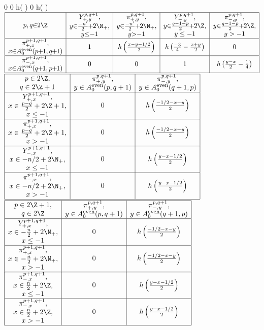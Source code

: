 \renewcommand{\d}[1]{\kern-0.1cm #1\kern-0.1cm}
\hspace*{0cm}\mytableFourTwo	%
{}											{}
{}			{0}
{}										{0}
{}									{h\left(  \right)}
\hspace*{0cm}\mytableThreeTwo	%
{}						{}
{}					{0}
{}					{h\left(  \right)}
\hspace*{-1.4cm}$\begin{array}{|@{}c@{}|@{}c@{}|@{}c@{}|@{}c@{}|@{}c@{}|}\hline	%
	\mrv{p,q\d{\in}2\Z} {\mystackiii{\yipy}{y\d{\in}\frac{-n'}{2}\d{+}2\N_+}{y\d{\le}-1}}{\mystackiii{\pipy}{y\d{\in}\frac{-n'}{2}\d{+}2\N_+}{y\d{>}-1}}
	{\mystackiii{\yimy}{y\d{\in} \frac{q-1-p}{2}\d{+}\tz}{y\le-1}}	{\mystackiii{\pimy}{y\kern-0.1cm\in\kern-0.1cm \frac{q-1-p}{2}\d{+}\tz}{y>-1}}
\mrv{\mystack{\pipx}{x\d{\in} \Azeven(p\d{+}1,q\d{+}1)}}	{1}	{h\left(\frac{x-y-1/2}{2}\right)} 	{h\left( \frac{-3}{4}-\frac{x+y}{2}\right)}{0}
\mrv{\mystack{\pimx}{x\d{\in} \Azeven(q\d{+}1,p\d{+}1)}}	{0} 				 	{0}{1} {h\left( \frac{y-x}{2}-\frac{1}{4} \right)}
\end{array}\newline$
\hspace*{-0cm}$\begin{array}{|@{}c@{}|@{}c@{}|@{}c@{}|}\hline	%
\mriii{\mystack{p\in2\Z}{q\in2\Z+1}}		{\mystack{\pipy}{y\in A_0^{\mbox{\normalfont\footnotesize even}}(p,q+1)}}	{\mystack{\pimy}{y\in A_0^{\mbox{\normalfont \footnotesize even}}(q+1,p)}}
\mriii{\mystackiii{\yipx}{x\in \frac{p-q}{2}+\tzo}{x\le-1}} {0} 										{h\left( \frac{-1/2-x-y}{2} \right)}
\mriii{\mystackiii{\pipx}{x\in \frac{p-q}{2}+\tzo}{x>-1}} {0} 										{h\left( \frac{-1/2-x-y}{2} \right)}
\mriii{\mystackiii{\yimx}{x\in -n/2+2\N_+}{x\le-1}} {0} {h\left( \frac{y-x-1/2}{2} \right)}
\mriii{\mystackiii{\pimx}{x\in -n/2+2\N_+}{x>-1}} {0} {h\left( \frac{y-x-1/2}{2} \right)}
\end{array}\newline$
\hspace*{-0cm}$\begin{array}{|@{}c@{}|@{}c@{}|@{}c@{}|}\hline	%
     \mriii{\mystack{p\in2\Z+1}{q\in2\Z}}	{\mystack{\pipy}{y\in A_0^{\mbox{\normalfont\footnotesize even}}(p,q+1)}}	{\mystack{\pimy}{y\in A_0^{\mbox{\normalfont \footnotesize even}}(q+1,p)}}
     \mriii{\mystackiii{\yipx}{x\in -\frac{n}{2}+2\N_+}{x\le-1}}		{0} 										{h\left( \frac{-1/2-x-y}{2} \right)}	
     \mriii{\mystackiii{\pipx}{x\in -\frac{n}{2}+2\N_+}{x>-1}}		{0} 										{h\left( \frac{-1/2-x-y}{2} \right)}	
     \mriii{\mystackiii{\pimx}{x\in \frac{n}{2}+\tz}{x\le-1}} {0} {h\left( \frac{y-x-1/2}{2} \right)}
     \mriii{\mystackiii{\pimx}{x\in \frac{n}{2}+\tz}{x>-1}} {0} {h\left( \frac{y-x-1/2}{2} \right)}
\end{array}\newline$
